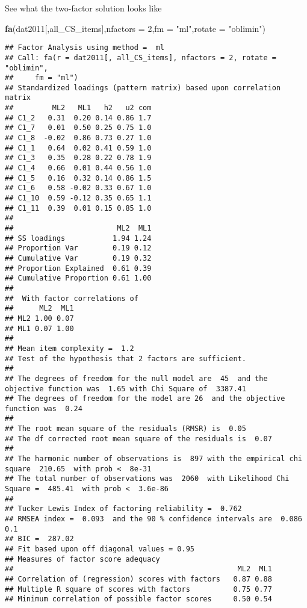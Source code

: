 \documentclass[
]{article}
\newenvironment{Shaded}{\begin{snugshade}}{\end{snugshade}}
\newcommand{\DataTypeTok}[1]{\textcolor[rgb]{0.13,0.29,0.53}{#1}}
\newcommand{\DecValTok}[1]{\textcolor[rgb]{0.00,0.00,0.81}{#1}}
\newcommand{\KeywordTok}[1]{\textcolor[rgb]{0.13,0.29,0.53}{\textbf{#1}}}
\newcommand{\NormalTok}[1]{#1}
\newcommand{\StringTok}[1]{\textcolor[rgb]{0.31,0.60,0.02}{#1}}
\begin{document}
See what the two-factor solution looks like

\begin{Shaded}
\begin{Highlighting}[]
\KeywordTok{fa}\NormalTok{(dat2011[,all_CS_items],}\DataTypeTok{nfactors =} \DecValTok{2}\NormalTok{,}\DataTypeTok{fm =} \StringTok{"ml"}\NormalTok{,}\DataTypeTok{rotate =} \StringTok{"oblimin"}\NormalTok{)}
\end{Highlighting}
\end{Shaded}

\begin{verbatim}
## Factor Analysis using method =  ml
## Call: fa(r = dat2011[, all_CS_items], nfactors = 2, rotate = "oblimin", 
##     fm = "ml")
## Standardized loadings (pattern matrix) based upon correlation matrix
##         ML2   ML1   h2   u2 com
## C1_2   0.31  0.20 0.14 0.86 1.7
## C1_7   0.01  0.50 0.25 0.75 1.0
## C1_8  -0.02  0.86 0.73 0.27 1.0
## C1_1   0.64  0.02 0.41 0.59 1.0
## C1_3   0.35  0.28 0.22 0.78 1.9
## C1_4   0.66  0.01 0.44 0.56 1.0
## C1_5   0.16  0.32 0.14 0.86 1.5
## C1_6   0.58 -0.02 0.33 0.67 1.0
## C1_10  0.59 -0.12 0.35 0.65 1.1
## C1_11  0.39  0.01 0.15 0.85 1.0
## 
##                        ML2  ML1
## SS loadings           1.94 1.24
## Proportion Var        0.19 0.12
## Cumulative Var        0.19 0.32
## Proportion Explained  0.61 0.39
## Cumulative Proportion 0.61 1.00
## 
##  With factor correlations of 
##      ML2  ML1
## ML2 1.00 0.07
## ML1 0.07 1.00
## 
## Mean item complexity =  1.2
## Test of the hypothesis that 2 factors are sufficient.
## 
## The degrees of freedom for the null model are  45  and the objective function was  1.65 with Chi Square of  3387.41
## The degrees of freedom for the model are 26  and the objective function was  0.24 
## 
## The root mean square of the residuals (RMSR) is  0.05 
## The df corrected root mean square of the residuals is  0.07 
## 
## The harmonic number of observations is  897 with the empirical chi square  210.65  with prob <  8e-31 
## The total number of observations was  2060  with Likelihood Chi Square =  485.41  with prob <  3.6e-86 
## 
## Tucker Lewis Index of factoring reliability =  0.762
## RMSEA index =  0.093  and the 90 % confidence intervals are  0.086 0.1
## BIC =  287.02
## Fit based upon off diagonal values = 0.95
## Measures of factor score adequacy             
##                                                    ML2  ML1
## Correlation of (regression) scores with factors   0.87 0.88
## Multiple R square of scores with factors          0.75 0.77
## Minimum correlation of possible factor scores     0.50 0.54
\end{verbatim}
\end{document}
